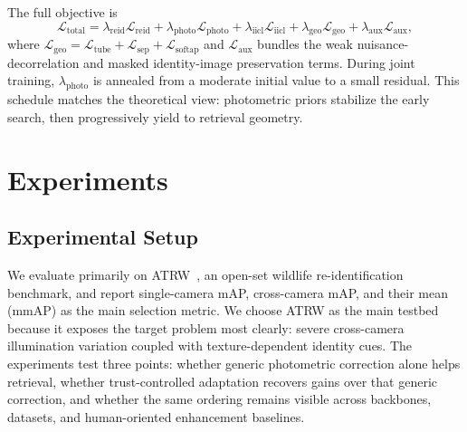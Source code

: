 \documentclass[sigconf,screen,review,anonymous]{acmart}
\begin{document}
The full objective is
\begin{equation}
  \mathcal{L}_{\text{total}}
  =
  \lambda_{\text{reid}}\mathcal{L}_{\text{reid}}
  +
  \lambda_{\text{photo}}\mathcal{L}_{\text{photo}}
  +
  \lambda_{\text{iicl}}\mathcal{L}_{\text{iicl}}
  +
  \lambda_{\text{geo}}\mathcal{L}_{\text{geo}}
  +
  \lambda_{\text{aux}}\mathcal{L}_{\text{aux}},
  \label{eq:total-loss}
\end{equation}
where
$\mathcal{L}_{\text{geo}} =
\mathcal{L}_{\text{tube}} + \mathcal{L}_{\text{sep}} + \mathcal{L}_{\text{softap}}$
and $\mathcal{L}_{\text{aux}}$ bundles the weak nuisance-decorrelation and
masked identity-image preservation terms.
During joint training, $\lambda_{\text{photo}}$ is annealed from a moderate
initial value to a small residual.
This schedule matches the theoretical view: photometric priors stabilize the
early search, then progressively yield to retrieval geometry.

\section{Experiments}

\subsection{Experimental Setup}
\label{sec:setup}

We evaluate primarily on ATRW~\cite{li2020atrw}, an open-set wildlife
re-identification benchmark, and report single-camera mAP, cross-camera mAP,
and their mean (mmAP) as the main selection metric.
We choose ATRW as the main testbed because it exposes the target problem most
clearly: severe cross-camera illumination variation coupled with
texture-dependent identity cues.
The experiments test three points: whether generic photometric correction alone
helps retrieval, whether trust-controlled adaptation recovers gains over that
generic correction, and whether the same ordering remains visible across
backbones, datasets, and human-oriented enhancement baselines.
\end{document}

